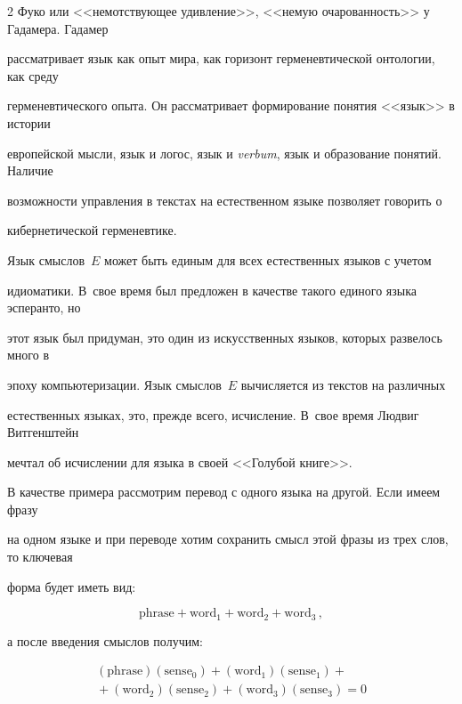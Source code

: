 \begin{multicols}{2}
Фуко или <<немотст\-ву\-ющее удивление>>, <<немую очарованность>> у Гадамера. Гадамер 


рассматривает язык как опыт мира, как горизонт герменевтической онтологии, как среду 


герменевтического опыта. Он рассматривает формирование понятия <<язык>> в истории 


европейской мысли, язык и логос, язык и \textit{verbum}, язык и образование понятий. Наличие 


возможности управ\-ле\-ния в текстах на естественном языке позволяет говорить о 


кибернетической герменевтике.


      


      Язык смыслов~$E$ может быть единым для всех естественных языков с учетом 


идиоматики. В~свое время был предложен в качестве такого единого языка эсперанто, но 


этот язык был придуман, это один из искусственных языков, которых развелось много в 


эпоху компьютеризации. Язык смыслов~$E$ вычисляется из текстов на различных 


естественных языках, это, прежде всего, исчисление. В~свое время Людвиг Витгенштейн 


мечтал об исчислении для языка в своей <<Голубой книге>>. 


      


      В качестве примера рассмотрим перевод с одного языка на другой. Если имеем фразу 


на одном языке и при переводе хотим сохранить смысл этой фразы из трех слов, то ключевая 


форма будет иметь вид:


$$


\mbox{phrase} + \mbox{word}_1 + \mbox{word}_2 + \mbox{word}_3\,,


      $$


а после введения смыслов получим:


\begin{multline*}


      (\mbox{phrase})(\mbox{sense}_0) + (\mbox{word}_1)(\mbox{sense}_1) +{}\\


      {}+ (\mbox{word}_2)(\mbox{sense}_2) + (\mbox{word}_3)(\mbox{sense}_3) = 0



\end{multline*}
\end{multicols}
